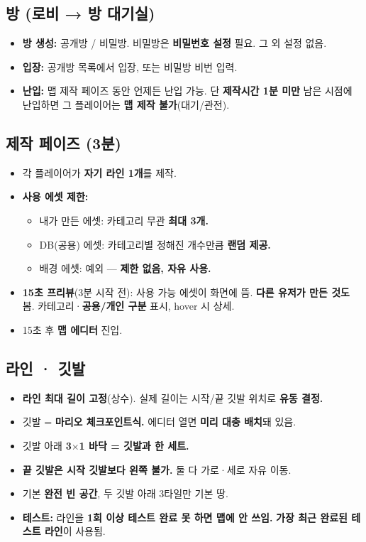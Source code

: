 \documentclass[11pt]{article}
\begin{document}
\subsection{방 (로비 → 방 대기실)}
\begin{itemize}
  \item \textbf{방 생성:} 공개방 / 비밀방. 비밀방은 \textbf{비밀번호 설정} 필요. 그 외 설정 없음.
  \item \textbf{입장:} 공개방 목록에서 입장, 또는 비밀방 비번 입력.
  \item \textbf{난입:} 맵 제작 페이즈 동안 언제든 난입 가능. 단 \textbf{제작시간 1분 미만} 남은 시점에 난입하면 그 플레이어는 \textbf{맵 제작 불가}(대기/관전).
\end{itemize}

\subsection{제작 페이즈 (3분)}
\begin{itemize}
  \item 각 플레이어가 \textbf{자기 라인 1개}를 제작.
  \item \textbf{사용 에셋 제한:}
  \begin{itemize}
    \item 내가 만든 에셋: 카테고리 무관 \textbf{최대 3개.}
    \item DB(공용) 에셋: 카테고리별 정해진 개수만큼 \textbf{랜덤 제공.}
    \item 배경 에셋: 예외 — \textbf{제한 없음, 자유 사용.}
  \end{itemize}
  \item \textbf{15초 프리뷰}(3분 시작 전): 사용 가능 에셋이 화면에 뜸. \textbf{다른 유저가 만든 것도} 봄. 카테고리·\textbf{공용/개인 구분} 표시, hover 시 상세.
  \item 15초 후 \textbf{맵 에디터} 진입.
\end{itemize}

\subsection{라인 · 깃발}
\begin{itemize}
  \item \textbf{라인 최대 길이 고정}(상수). 실제 길이는 시작/끝 깃발 위치로 \textbf{유동 결정.}
  \item 깃발 = \textbf{마리오 체크포인트식.} 에디터 열면 \textbf{미리 대충 배치}돼 있음.
  \item 깃발 아래 \textbf{3$\times$1 바닥 = 깃발과 한 세트.}
  \item \textbf{끝 깃발은 시작 깃발보다 왼쪽 불가.} 둘 다 가로·세로 자유 이동.
  \item 기본 \textbf{완전 빈 공간}, 두 깃발 아래 3타일만 기본 땅.
  \item \textbf{테스트:} 라인을 \textbf{1회 이상 테스트 완료 못 하면 맵에 안 쓰임.} \textbf{가장 최근 완료된 테스트 라인}이 사용됨.
\end{itemize}
\end{document}

